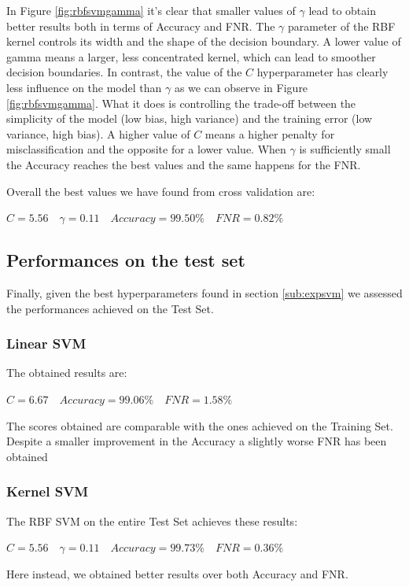 \documentclass[twocolumn, switch]{article} %
\begin{document}
In Figure \ref{fig:rbfsvmgamma} it's clear that smaller values of $\gamma$ lead to obtain better results both in terms of Accuracy and FNR. The $\gamma$ parameter of the RBF kernel controls its width and the shape of the decision boundary. A lower value of gamma means a larger, less concentrated kernel, which can lead to smoother decision boundaries.\newline
In contrast, the value of the $C$ hyperparameter has clearly less influence on the model than $\gamma$ as we can observe in Figure \ref{fig:rbfsvmgamma}. What it does is controlling the trade-off between the simplicity of the model (low bias, high variance) and the training error (low variance, high bias). A higher value of $C$ means a higher penalty for misclassification and the opposite for a lower value.
When $\gamma$ is sufficiently small the Accuracy reaches the best values and the same happens for the FNR.

Overall the best values we have found from cross validation are:
\begin{center}
	$C=5.56\quad\gamma=0.11 \quad Accuracy=99.50\% \quad FNR=0.82\%$
\end{center}

\subsection{Performances on the test set}
Finally, given the best hyperparameters found in section \ref{sub:expsvm} we assessed the performances achieved on the Test Set.
\subsubsection{Linear SVM}
The obtained results are:
\begin{center}
	$C=6.67 \quad Accuracy=99.06\% \quad FNR=1.58\%$
\end{center}
The scores obtained are comparable with the ones achieved on the Training Set. Despite a smaller improvement in the Accuracy a slightly worse FNR has been obtained

\subsubsection{Kernel SVM}
The RBF SVM on the entire Test Set achieves these results:
\begin{center}
	$C=5.56 \quad \gamma=0.11 \quad Accuracy=99.73\% \quad FNR=0.36\%$
\end{center}
Here instead, we obtained better results over both Accuracy and FNR.
\end{document}

